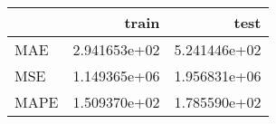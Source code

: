 \begin{tabular}{lrr}
\toprule
{} &         train &          test \\
\midrule
MAE  &  2.941653e+02 &  5.241446e+02 \\
MSE  &  1.149365e+06 &  1.956831e+06 \\
MAPE &  1.509370e+02 &  1.785590e+02 \\
\bottomrule
\end{tabular}
